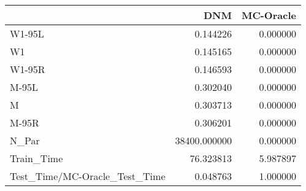 \begin{tabular}{lrr}
\toprule
{} &           DNM &  MC-Oracle \\
\midrule
W1-95L                        &      0.144226 &   0.000000 \\
W1                            &      0.145165 &   0.000000 \\
W1-95R                        &      0.146593 &   0.000000 \\
M-95L                         &      0.302040 &   0.000000 \\
M                             &      0.303713 &   0.000000 \\
M-95R                         &      0.306201 &   0.000000 \\
N\_Par                         &  38400.000000 &   0.000000 \\
Train\_Time                    &     76.323813 &   5.987897 \\
Test\_Time/MC-Oracle\_Test\_Time &      0.048763 &   1.000000 \\
\bottomrule
\end{tabular}
